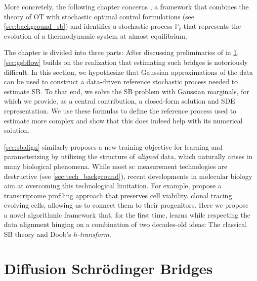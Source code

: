 More concretely, the following chapter concerns , a framework that combines the theory of \acrlong{OT} with stochastic optimal control formulations (see \cref{sec:background_sb}) and identifies a stochastic process $\mathbb{P}_t$ that represents the evolution of a thermodynamic system at almost equilibrium.

The chapter is divided into three parts: 
After discussing preliminaries of  in \cref{sec:background_dsb}, \cref{sec:gsbflow} builds on the realization that estimating such bridges is notoriously difficult. In this section, we hypothesize that Gaussian approximations of the data can be used to construct a data-driven reference stochastic process needed to estimate \acrshort{SB}. To that end, we solve the \acrshort{SB} problem with Gaussian marginals, for which we provide, as a central contribution, a closed-form solution and \acrshort{SDE} representation. We use these formulas to define the reference process used to estimate more complex  and show that this does indeed help with its numerical solution.

\cref{sec:sbalign} similarly proposes a new training objective for learning and parameterizing  by utilizing the structure of \emph{aligned} data, which naturally arises in many biological phenomena.
While most \acrlong{sc} measurement technologies are destructive (see \cref{sec:tech_background}), recent developments in molecular biology aim at overcoming this technological limitation. For example, \citet{chen2022live} propose a transcriptome profiling approach that preserves cell viability. \citet{weinreb2020lineage} clonal tracing evolving cells, allowing us to connect them to their progenitors.
Here we propose a novel algorithmic framework that, for the first time, learns  while respecting the data alignment hinging on a combination of two decades-old ideas: The classical \acrlong{SB} theory and Doob's \emph{$h$-transform}.

\section{Diffusion Schr{\"o}dinger Bridges}
\label{sec:background_dsb}

